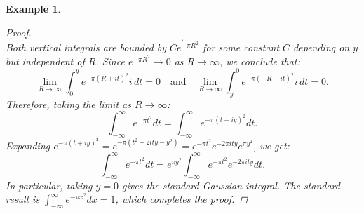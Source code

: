 \documentclass[a4paper]{article}
\newtheorem{eg}[thm]{Example}
\begin{document}
\begin{eg}
\begin{proof}
\[        .\]
        Both vertical integrals are bounded by $C e^{-\pi R^2}$ for some constant $C$ depending on $y$ but independent of $R$. Since $e^{-\pi R^2} \to 0$ as $R\to\infty$, we conclude that:
        \[
        \lim_{R\to\infty}\int_{0}^{y}e^{-\pi(R+it)^2}i\,dt = 0 \quad \text{and} \quad \lim_{R\to\infty}\int_{y}^{0}e^{-\pi(-R+it)^2}i\,dt = 0
        .\]
        Therefore, taking the limit as $R\to\infty$:
        \[
        \int_{-\infty}^{\infty}e^{-\pi t^2}dt = \int_{-\infty}^{\infty}e^{-\pi(t+iy)^2}dt
        .\]
        Expanding $e^{-\pi(t+iy)^2}=e^{-\pi(t^2+2ity-y^2)}=e^{-\pi t^2}e^{-2\pi ity}e^{\pi y^2}$, we get:
        \[
        \int_{-\infty}^{\infty}e^{-\pi t^2}dt = e^{\pi y^2}\int_{-\infty}^{\infty}e^{-\pi t^2}e^{-2\pi ity}dt
        .\]
        In particular, taking $y=0$ gives the standard Gaussian integral. The standard result is $\int_{-\infty}^{\infty}e^{-\pi x^2}dx=1$, which completes the proof.
    \end{proof}
\end{eg}
\end{document}
